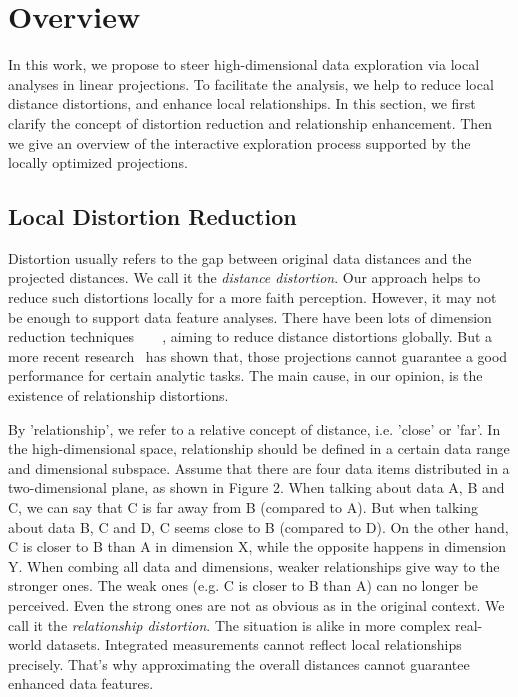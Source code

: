 \section{Overview}
\label{section:overview}
In this work, we propose to steer high-dimensional data exploration via local analyses in linear projections. To facilitate the analysis, we help to reduce local distance distortions, and enhance local relationships. In this section, we first clarify the concept of distortion reduction and relationship enhancement. Then we give an overview of the interactive exploration process supported by the locally optimized projections.

\subsection{Local Distortion Reduction}
Distortion usually refers to the gap between original data distances and the projected distances. We call it the \emph{distance distortion}. Our approach helps to reduce such distortions locally for a more faith perception. However, it may not be enough to support data feature analyses. There have been lots of dimension reduction techniques~\cite{jolliffe2002principal}~\cite{borg2005modern}~\cite{tenenbaum2000global}~\cite{roweis2000nonlinear}, aiming to reduce distance distortions globally. But a more recent research~\cite{DBLP:journals/tvcg/EtemadpourMPMOL15} has shown that, those projections cannot guarantee a good performance for certain analytic tasks. The main cause, in our opinion, is the existence of relationship distortions.

By 'relationship', we refer to a relative concept of distance, i.e. 'close' or 'far'. In the high-dimensional space, relationship should be defined in a certain data range and dimensional subspace. Assume that there are four data items distributed in a two-dimensional plane, as shown in Figure 2.  When talking about data A, B and C, we can say that C is far away from B (compared to A). But when talking about data B, C and D, C seems close to B (compared to D). On the other hand, C is closer to B than A in dimension X, while the opposite happens in dimension Y. When combing all data and dimensions, weaker relationships give way to the stronger ones. The weak ones (e.g. C is closer to B than A) can no longer be perceived. Even the strong ones are not as obvious as in the original context. We call it the \emph{relationship distortion}. The situation is alike in more complex real-world datasets. Integrated measurements cannot reflect local relationships precisely. That's why approximating the overall distances cannot guarantee enhanced data features.

